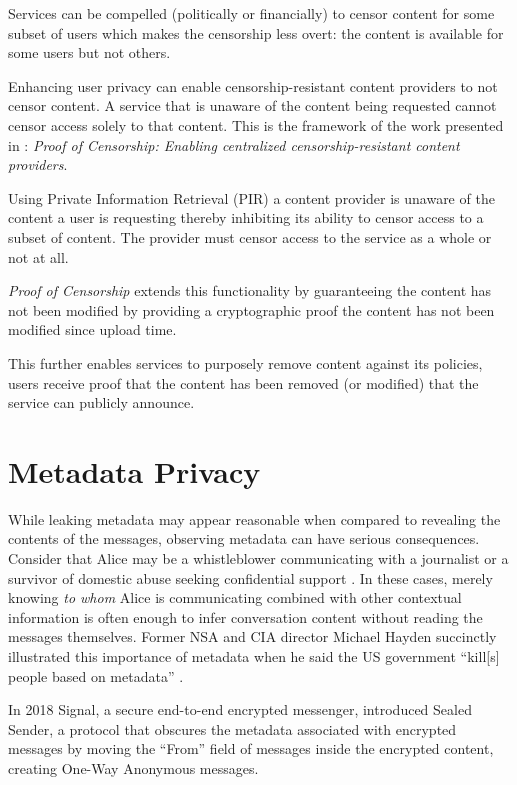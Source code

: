 Services can be compelled (politically or financially) to censor content for
some subset of users which makes the censorship less overt: the content is
available for some users but not others. 

Enhancing user privacy can enable censorship-resistant content providers to not
censor content. A service that is unaware of the content being requested cannot
censor access solely to that content. This is the framework of the work
presented in : \emph{Proof of Censorship: Enabling centralized
censorship-resistant content providers}.

Using Private Information Retrieval (PIR) a content provider is unaware of the
content a user is requesting thereby inhibiting its ability to censor access to
a subset of content. The provider must censor access to the service as a whole
or not at all.

\emph{Proof of Censorship} extends this functionality by guaranteeing the
content has not been modified by providing a cryptographic proof the content has
not been modified since upload time.

This further enables services to purposely remove content against its policies,
users receive proof that the content has been removed (or modified) that the
service can publicly announce.

\section{Metadata Privacy}
While leaking metadata may appear reasonable when compared to revealing the
contents of the messages, observing metadata can have serious consequences.
Consider that Alice may be a whistleblower communicating with a journalist
\cite{190976} or a survivor of domestic abuse seeking confidential support
\cite{236244}. In these cases, merely knowing \emph{to whom} Alice is
communicating combined with other contextual information is often enough to
infer conversation content without reading the messages themselves. Former NSA
and CIA director Michael Hayden succinctly illustrated this importance of
metadata when he said the US government ``kill[s] people based on metadata''
\cite{haydenmetadata}.

In 2018 Signal, a secure end-to-end encrypted messenger, introduced Sealed
Sender\cite{sealed-sender}, a protocol that obscures the metadata associated
with encrypted messages by moving the ``From'' field of messages inside the
encrypted content, creating One-Way Anonymous messages.

